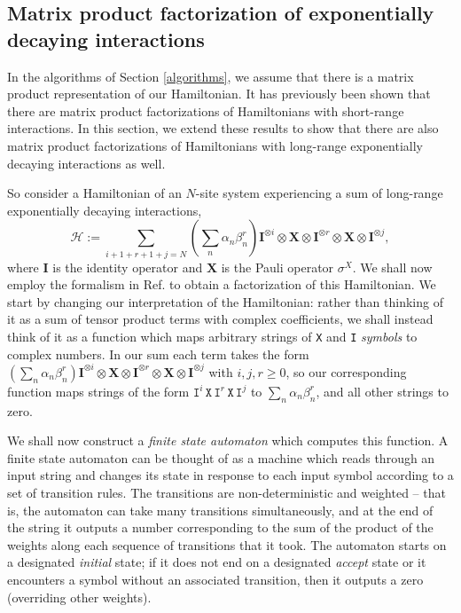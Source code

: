 \documentclass[12pt]{amsbook}
\theoremstyle{plain}
\theoremstyle{definition}
\theoremstyle{remark}
\newcommand{\paren}[1]{\left(#1\right)}
\begin{document}
\subsection{Matrix product factorization of exponentially decaying interactions}
\label{automaton}

In the algorithms of Section \ref{algorithms}, we assume that there is a matrix product representation of our Hamiltonian.  It has previously been shown that there are matrix product factorizations of Hamiltonians with short-range interactions.\cite{cond-mat/0701428,caching}  In this section, we extend these results to show that there are also matrix product factorizations of Hamiltonians with long-range exponentially decaying interactions as well.

So consider a Hamiltonian of an $N$-site system experiencing a sum of long-range exponentially decaying interactions,
$$\mathcal{H}:=\sum_{i+1+r+1+j=N} \paren{\sum_n \alpha_n \beta_n^r} \textbf{I}^{\otimes i}\otimes \textbf{X} \otimes \textbf{I}^{\otimes r}\otimes \textbf{X} \otimes \textbf{I}^{\otimes j},$$ where $\textbf{I}$ is the identity operator and $\textbf{X}$ is the Pauli operator $\sigma^X$.  We shall now employ the formalism in Ref. \cite{caching} to obtain a factorization of this Hamiltonian.  We start by changing our interpretation of the Hamiltonian:  rather than thinking of it as a sum of tensor product terms with complex coefficients, we shall instead think of it as a function which maps arbitrary strings of \texttt{X} and \texttt{I} \emph{symbols} to complex numbers.  In our sum each term takes the form $\paren{\sum_n \alpha_n \beta_n^r} \textbf{I}^{\otimes i}\otimes \textbf{X} \otimes \textbf{I}^{\otimes r}\otimes \textbf{X} \otimes \textbf{I}^{\otimes j}$ with $i,j,r \ge 0$, so our corresponding function maps strings of the form $\texttt{I}^i\, \texttt{X}\, \texttt{I}^r\, \texttt{X}\, \texttt{I}^j$ to $\sum_n \alpha_n \beta_n^r$, and all other strings to zero.

We shall now construct a \emph{finite state automaton} which computes this function.  A finite state automaton can be thought of as a machine which reads through an input string and changes its state in response to each input symbol according to a set of transition rules.  The transitions are non-deterministic and weighted -- that is, the automaton can take many transitions simultaneously, and at the end of the string it outputs a number corresponding to the sum of the product of the weights along each sequence of transitions that it took.  The automaton starts on a designated \emph{initial} state;  if it does not end on a designated \emph{accept} state or it encounters a symbol without an associated transition, then it outputs a zero (overriding other weights).
\end{document}
